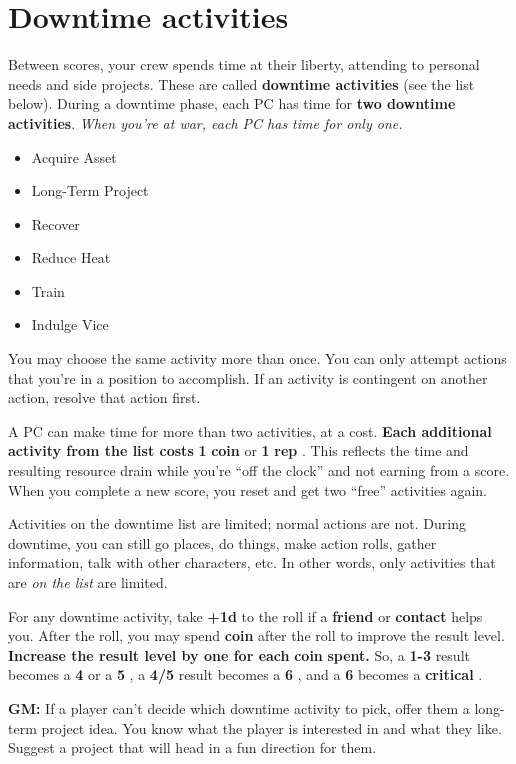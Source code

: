 \documentclass[11pt,oneside]{book}
\newcommand{\gameterm}[1]{\textbf{#1}}
\begin{document}
\chapter{Downtime activities}

Between scores, your crew spends time at their liberty, attending to personal needs and side projects. These are called \textbf{downtime activities} (see the list below). During a downtime phase, each PC has time for \textbf{two downtime activities}. \emph{When you’re at war, each PC has time for only one.}

\begin{itemize}
	\item Acquire Asset
	\item Long-Term Project
	\item Recover
	\item Reduce Heat
	\item Train
	\item Indulge Vice
\end{itemize}

You may choose the same activity more than once. You can only attempt actions that you’re in a position to accomplish. If an activity is contingent on another action, resolve that action first.

A PC can make time for more than two activities, at a cost. \textbf{Each additional activity from the list costs} \textbf{1} \gameterm{coin}  or \textbf{1} \gameterm{rep} . This reflects the time and resulting resource drain while you’re “off the clock” and not earning from a score. When you complete a new score, you reset and get two “free” activities again.

Activities on the downtime list are limited; normal actions are not. During downtime, you can still go places, do things, make action rolls, gather information, talk with other characters, etc. In other words, only activities that are \emph{on the list} are limited.

For any downtime activity, take \textbf{+1d} to the roll if a \textbf{friend} or \textbf{contact} helps you. After the roll, you may spend \gameterm{coin}  after the roll to improve the result level. \textbf{Increase the result level by one for each }\gameterm{coin} \textbf{ spent.} So, a \gameterm{1-3}  result becomes a \gameterm{4}  or a \gameterm{5} , a \gameterm{4/5}  result becomes a \gameterm{6} , and a \gameterm{6}  becomes a \gameterm{critical} .

\textbf{GM:} If a player can’t decide which downtime activity to pick, offer them a long-term project idea. You know what the player is interested in and what they like. Suggest a project that will head in a fun direction for them.
\end{document}

